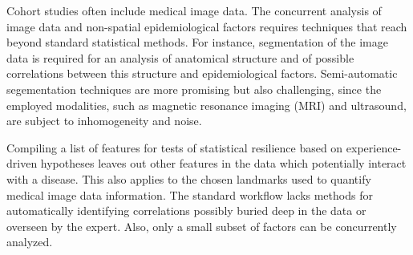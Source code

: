 \documentclass[journal]{style/vgtc} 			          %
\begin{document}
%
Cohort studies often include medical image data.
% 
The concurrent analysis of image data and non-spatial epidemiological factors requires techniques that reach beyond standard statistical methods.
%
For instance, segmentation of the image data is required for an analysis of anatomical structure and of possible correlations between this structure and epidemiological factors.
%
Semi-automatic segementation techniques are more promising but also challenging, since the employed modalities, such as magnetic resonance imaging (MRI) and ultrasound, are subject to inhomogeneity and noise.
%

Compiling a list of features for tests of statistical resilience based on experience-driven hypotheses leaves out other features in the data which potentially interact with a disease.
%
This also applies to the chosen landmarks used to quantify medical image data information.
%
%
The standard workflow lacks methods for automatically identifying correlations possibly buried deep in the data or overseen by the expert.
%
Also, only a small subset of factors can be concurrently analyzed.
%
\end{document}
